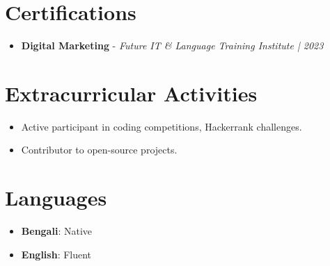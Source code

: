 \documentclass[a4paper,10pt]{article}
\begin{document}

\vspace{4mm}

\vspace{4mm}

\section*{Certifications}
\begin{itemize}[leftmargin=1cm, label={\color{primary}\textbullet}]
    \item \textbf{Digital Marketing} - \textit{Future IT \& Language Training Institute | 2023}
\end{itemize}

\vspace{4mm}

\section*{Extracurricular Activities}
\begin{itemize}[leftmargin=1cm, label={\color{primary}\textbullet}]
    \item Active participant in coding competitions, Hackerrank challenges.
    \item Contributor to open-source projects.
\end{itemize}

\vspace{4mm}

\section*{Languages}
\begin{itemize}[leftmargin=1cm, label={\color{primary}\textbullet}]
    \item \textbf{Bengali}: Native
    \item \textbf{English}: Fluent
\end{itemize}

\vspace{4mm}

\end{document}
